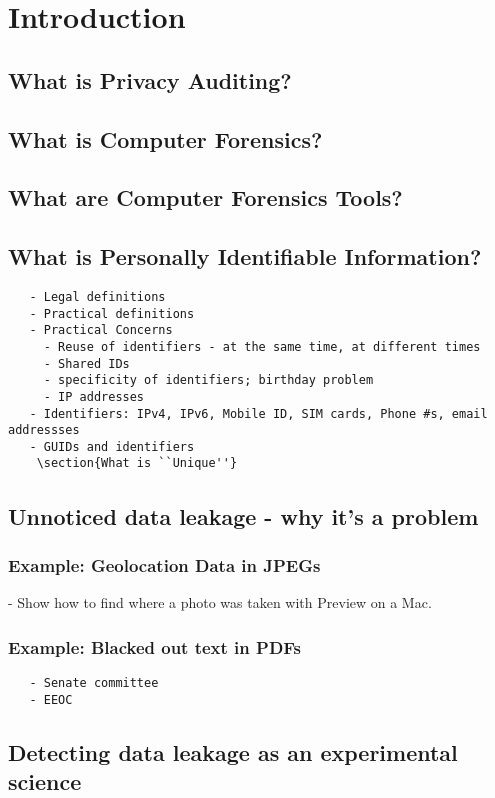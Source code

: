 \chapter{Introduction}
\section{What is Privacy Auditing?}
\section{What is Computer Forensics?}
\section{What are Computer Forensics Tools?}
\section{What is Personally Identifiable Information?}
\begin{Verbatim}
   - Legal definitions
   - Practical definitions
   - Practical Concerns
     - Reuse of identifiers - at the same time, at different times
     - Shared IDs
     - specificity of identifiers; birthday problem
     - IP addresses
   - Identifiers: IPv4, IPv6, Mobile ID, SIM cards, Phone #s, email addressses
   - GUIDs and identifiers
    \section{What is ``Unique''}
\end{Verbatim}
\section{Unnoticed data leakage - why it's a problem}
\subsection{Example: Geolocation Data in JPEGs}
  - Show how to find where a photo was taken with Preview on a Mac. 
\subsection{Example: Blacked out text in PDFs}
\begin{Verbatim}
   - Senate committee
   - EEOC
\end{Verbatim}
\section{Detecting data leakage as an experimental science}
